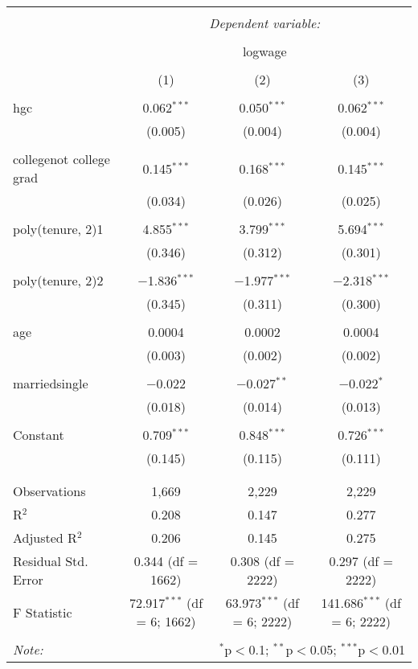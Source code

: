 \documentclass{article}
\begin{document}
\begin{table}[!htbp] \centering 
  \caption{} 
  \label{} 
\begin{tabular}{@{\extracolsep{5pt}}lccc} 
\\[-1.8ex]\hline 
\hline \\[-1.8ex] 
 & \multicolumn{3}{c}{\textit{Dependent variable:}} \\ 
\cline{2-4} 
\\[-1.8ex] & \multicolumn{3}{c}{logwage} \\ 
\\[-1.8ex] & (1) & (2) & (3)\\ 
\hline \\[-1.8ex] 
 hgc & 0.062$^{***}$ & 0.050$^{***}$ & 0.062$^{***}$ \\ 
  & (0.005) & (0.004) & (0.004) \\ 
  & & & \\ 
 collegenot college grad & 0.145$^{***}$ & 0.168$^{***}$ & 0.145$^{***}$ \\ 
  & (0.034) & (0.026) & (0.025) \\ 
  & & & \\ 
 poly(tenure, 2)1 & 4.855$^{***}$ & 3.799$^{***}$ & 5.694$^{***}$ \\ 
  & (0.346) & (0.312) & (0.301) \\ 
  & & & \\ 
 poly(tenure, 2)2 & $-$1.836$^{***}$ & $-$1.977$^{***}$ & $-$2.318$^{***}$ \\ 
  & (0.345) & (0.311) & (0.300) \\ 
  & & & \\ 
 age & 0.0004 & 0.0002 & 0.0004 \\ 
  & (0.003) & (0.002) & (0.002) \\ 
  & & & \\ 
 marriedsingle & $-$0.022 & $-$0.027$^{**}$ & $-$0.022$^{*}$ \\ 
  & (0.018) & (0.014) & (0.013) \\ 
  & & & \\ 
 Constant & 0.709$^{***}$ & 0.848$^{***}$ & 0.726$^{***}$ \\ 
  & (0.145) & (0.115) & (0.111) \\ 
  & & & \\ 
\hline \\[-1.8ex] 
Observations & 1,669 & 2,229 & 2,229 \\ 
R$^{2}$ & 0.208 & 0.147 & 0.277 \\ 
Adjusted R$^{2}$ & 0.206 & 0.145 & 0.275 \\ 
Residual Std. Error & 0.344 (df = 1662) & 0.308 (df = 2222) & 0.297 (df = 2222) \\ 
F Statistic & 72.917$^{***}$ (df = 6; 1662) & 63.973$^{***}$ (df = 6; 2222) & 141.686$^{***}$ (df = 6; 2222) \\ 
\hline 
\hline \\[-1.8ex] 
\textit{Note:}  & \multicolumn{3}{r}{$^{*}$p$<$0.1; $^{**}$p$<$0.05; $^{***}$p$<$0.01} \\ 
\end{tabular} 
\end{table} 
\end{document}

